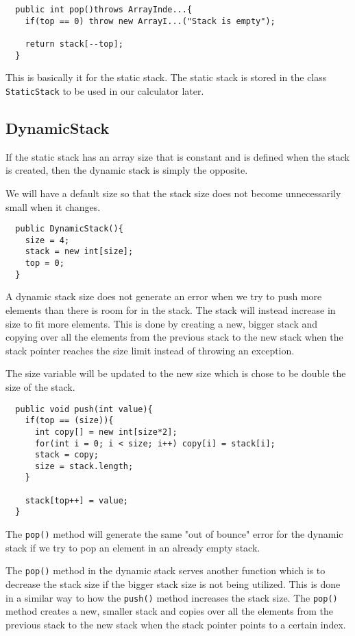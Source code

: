 \documentclass[a4paper,11pt]{article}
\begin{document}
\begin{verbatim}
  public int pop()throws ArrayInde...{
    if(top == 0) throw new ArrayI...("Stack is empty");
    
    return stack[--top];
  }
\end{verbatim}

This is basically it for the static stack. The static stack is stored
in the class {\tt StaticStack} to be used in our calculator later.

\subsection*{DynamicStack}

If the static stack has an array size that is constant and is defined
when the stack is created, then the dynamic stack is simply the 
opposite. 

We will have a default size so that the stack size does not become 
unnecessarily small when it changes.

\begin{verbatim}
  public DynamicStack(){
    size = 4;
    stack = new int[size];
    top = 0;
  }
\end{verbatim}

A dynamic stack size does not generate an error when we try to push
more elements than there is room for in the stack. The stack will
instead increase in size to fit more elements. This is done by 
creating a new, bigger stack and copying over all the elements from
the previous stack to the new stack when the stack pointer reaches 
the size limit instead of throwing an exception. 

The size variable will be updated to the new size which is chose to 
be double the size of the stack.

\begin{verbatim}
  public void push(int value){
    if(top == (size)){
      int copy[] = new int[size*2];
      for(int i = 0; i < size; i++) copy[i] = stack[i];
      stack = copy;
      size = stack.length;
    }

    stack[top++] = value;
  }
\end{verbatim}

The {\tt pop()} method will generate the same "out of bounce" error
for the dynamic stack if we try to pop an element in an already empty 
stack.

The {\tt pop()} method in the dynamic stack serves another function 
which is to decrease the stack size if the bigger stack size is not
being utilized. This is done in a similar way to how the {\tt push()}
method increases the stack size. The {\tt pop()} method creates a new,
smaller stack and copies over all the elements from the previous stack 
to the new stack when the stack pointer points to a certain index.
\end{document}
